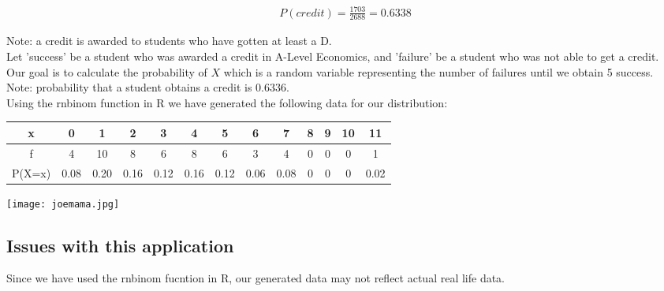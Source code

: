 \documentclass{article}
\begin{document}
\begin{gather*}
  P(credit) = \frac{1703}{2688} = 0.6338
\end{gather*}

Note: a credit is awarded to students who have gotten at least a D.\\


Let 'success' be a student who was awarded a credit in A-Level Economics,
and 'failure' be a student who was not able to get a credit. \\

Our goal is to calculate the probability of $X$ which is a random variable
representing the number of failures until we obtain 5 success. \\

Note: probability that a student obtains a credit is 0.6336.
\\



Using the rnbinom function in R we have generated the following
data for our distribution:

\begin{center}
  \begin{tabular}{|c|c|c|c|c|c|c|c|c|c|c|c|c|}
    \hline
    x & 0 & 1 & 2 & 3 & 4 & 5 & 6 & 7 & 8 & 9 & 10 & 11 \\
    \hline
    f & 4 & 10 & 8 & 6 & 8 & 6 & 3 & 4 & 0 & 0 & 0 & 1\\
    \hline
    P(X=x) & 0.08 & 0.20 & 0.16 & 0.12 & 0.16 & 0.12 & 0.06 & 0.08 & 0 & 0 & 0 & 0.02 \\
    \hline
  \end{tabular}
\end{center}


\begin{center}
  \texttt{[image: joemama.jpg]}
\end{center}

\subsection{Issues with this application}
Since we have used the rnbinom fucntion in R, our
generated data may not reflect actual real life data.
\end{document}
